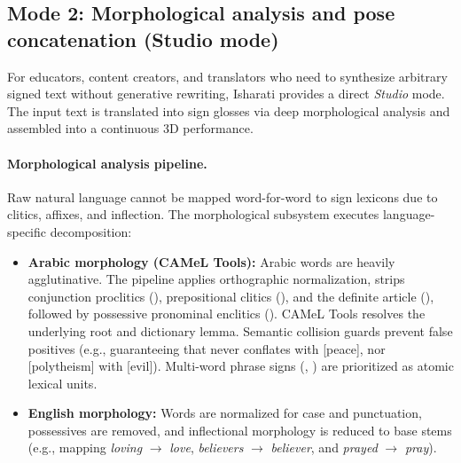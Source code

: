 \subsection{Mode 2: Morphological analysis and pose concatenation (Studio mode)}
\label{sec:mode_studio}
For educators, content creators, and translators who need to synthesize arbitrary signed text without generative rewriting, Isharati provides a direct \emph{Studio} mode. The input text is translated into sign glosses via deep morphological analysis and assembled into a continuous 3D performance.

\paragraph{Morphological analysis pipeline.} Raw natural language cannot be mapped word-for-word to sign lexicons due to clitics, affixes, and inflection. The morphological subsystem executes language-specific decomposition:
\begin{itemize}[leftmargin=*,itemsep=2pt]
  \item \textbf{Arabic morphology (CAMeL Tools):} Arabic words are heavily agglutinative. The pipeline applies orthographic normalization, strips conjunction proclitics (), prepositional clitics (), and the definite article (), followed by possessive pronominal enclitics (). CAMeL Tools \cite{camel} resolves the underlying root and dictionary lemma. Semantic collision guards prevent false positives (e.g., guaranteeing that  never conflates with  [peace], nor  [polytheism] with  [evil]). Multi-word phrase signs (, ) are prioritized as atomic lexical units.
  \item \textbf{English morphology:} Words are normalized for case and punctuation, possessives are removed, and inflectional morphology is reduced to base stems (e.g., mapping \emph{loving} $\rightarrow$ \emph{love}, \emph{believers} $\rightarrow$ \emph{believer}, and \emph{prayed} $\rightarrow$ \emph{pray}).
\end{itemize}

